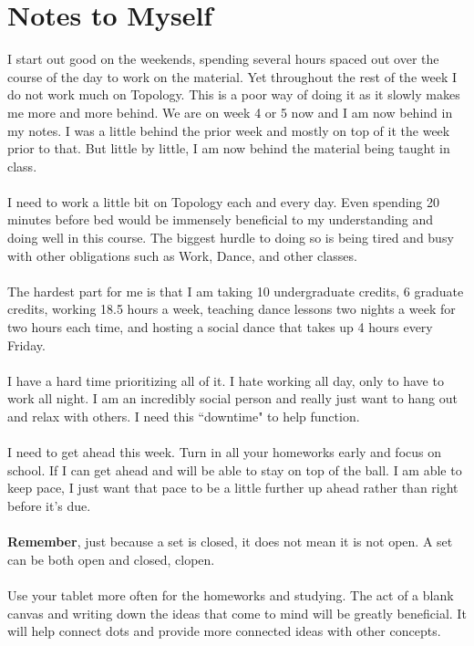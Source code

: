 \documentclass[10pt]{article}
\begin{document}
\section{Notes to Myself}
I start out good on the weekends, spending several hours spaced out over the course of the day to work on the material. Yet throughout the rest of the week I do not work much on Topology. This is a poor way of doing it as it slowly makes me more and more behind. We are on week 4 or 5 now and I am now behind in my notes. I was a little behind the prior week and mostly on top of it the week prior to that. But little by little, I am now behind the material being taught in class.\\
\\
I need to work a little bit on Topology each and every day. Even spending 20 minutes before bed would be immensely beneficial to my understanding and doing well in this course. The biggest hurdle to doing so is being tired and busy with other obligations such as Work, Dance, and other classes. \\
\\
The hardest part for me is that I am taking 10 undergraduate credits, 6 graduate credits, working 18.5 hours a week, teaching dance lessons two nights a week for two hours each time, and hosting a social dance that takes up 4 hours every Friday.\\
\\
I have a hard time prioritizing all of it. I hate working all day, only to have to work all night. I am an incredibly social person and really just want to hang out and relax with others. I need this ``downtime" to help function.\\
\\
I need to get ahead this week. Turn in all your homeworks early and focus on school. If I can get ahead and will be able to stay on top of the ball. I am able to keep pace, I just want that pace to be a little further up ahead rather than right before it's due. \\
\\
\textbf{Remember}, just because a set is closed, it does not mean it is not open. A set can be both open and closed, clopen.\\
\\
Use your tablet more often for the homeworks and studying. The act of a blank canvas and writing down the ideas that come to mind will be greatly beneficial. It will help connect dots and provide more connected ideas with other concepts.\\
\end{document}
